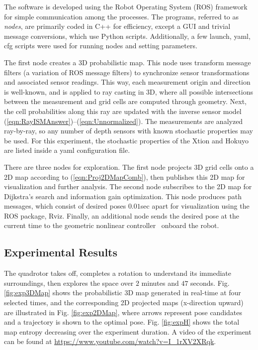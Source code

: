 \documentclass[smallextended]{svjour3}       %
\newcommand{\refeqn}[1]{(\ref{eqn:#1})}
\begin{document}
The software is developed using the Robot Operating System (ROS) framework for simple communication among the processes. The programs, referred to as \emph{nodes}, are primarily coded in C++ for efficiency, except a GUI and trivial message conversions, which use Python scripts. Additionally, a few launch, yaml, cfg scripts were used for running nodes and setting parameters.  

The first node creates a 3D probabilistic map. This node uses transform message filters (a variation of ROS message filters) to synchronize sensor transformations and associated sensor readings. This way, each measurement origin and direction is well-known, and is applied to ray casting in 3D, where all possible intersections between the measurement and grid cells are computed through geometry. Next, the cell probabilities along this ray are updated with the inverse sensor model \refeqn{RayISMAnswer}--\refeqn{Unnormalized}. The measurements are analyzed ray-by-ray, so any number of depth sensors with known stochastic properties may be used. For this experiment, the stochastic properties of the Xtion and Hokuyo are listed inside a yaml configuration file.


There are three nodes for exploration. The first node projects 3D grid cells onto a 2D map according to \refeqn{Proj2DMapComb}, then publishes this 2D map for visualization and further analysis. The second node subscribes to the 2D map for Dijkstra's search and information gain optimization. This node produces path messages, which consist of desired poses $0.01$sec apart for visualization using the ROS package, Rviz. Finally, an additional node sends the desired pose at the current time to the geometric nonlinear controller~\cite{GooDaeLee13} onboard the robot.

\subsection{Experimental Results}
                
The quadrotor takes off, completes a rotation to understand its immediate surroundings, then explores the space over $2$ minutes and $47$ seconds. Fig. \ref{fig:exp3DMap} shows the probabilistic 3D map generated in real-time at four selected times, and the corresponding 2D projected maps (x-direction upward) are illustrated in Fig. \ref{fig:exp2DMap}, where arrows represent pose candidates and a trajectory is shown to the optimal pose. Fig. \ref{fig:expH} shows the total map entropy decreasing over the experiment duration. A video of the experiment can be found at \href{https://www.youtube.com/watch?v=I_1rXV2XRqk}{https://www.youtube.com/watch?v=I\_1rXV2XRqk}.
\end{document}
